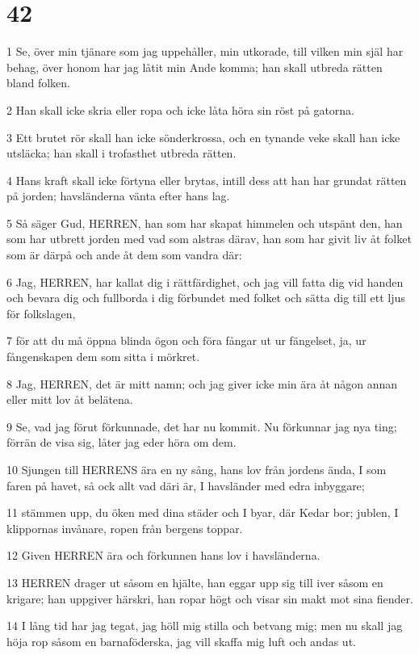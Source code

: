 \chapter{42}

\par 1 Se, över min tjänare som jag uppehåller, min utkorade, till vilken min själ har behag, över honom har jag låtit min Ande komma; han skall utbreda rätten bland folken.
\par 2 Han skall icke skria eller ropa och icke låta höra sin röst på gatorna.
\par 3 Ett brutet rör skall han icke sönderkrossa, och en tynande veke skall han icke utsläcka; han skall i trofasthet utbreda rätten.
\par 4 Hans kraft skall icke förtyna eller brytas, intill dess att han har grundat rätten på jorden; havsländerna vänta efter hans lag.
\par 5 Så säger Gud, HERREN, han som har skapat himmelen och utspänt den, han som har utbrett jorden med vad som alstras därav, han som har givit liv åt folket som är därpå och ande åt dem som vandra där:
\par 6 Jag, HERREN, har kallat dig i rättfärdighet, och jag vill fatta dig vid handen och bevara dig och fullborda i dig förbundet med folket och sätta dig till ett ljus för folkslagen,
\par 7 för att du må öppna blinda ögon och föra fångar ut ur fängelset, ja, ur fångenskapen dem som sitta i mörkret.
\par 8 Jag, HERREN, det är mitt namn; och jag giver icke min ära åt någon annan eller mitt lov åt belätena.
\par 9 Se, vad jag förut förkunnade, det har nu kommit. Nu förkunnar jag nya ting; förrän de visa sig, låter jag eder höra om dem.
\par 10 Sjungen till HERRENS ära en ny sång, hans lov från jordens ända, I som faren på havet, så ock allt vad däri är, I havsländer med edra inbyggare;
\par 11 stämmen upp, du öken med dina städer och I byar, där Kedar bor; jublen, I klippornas invånare, ropen från bergens toppar.
\par 12 Given HERREN ära och förkunnen hans lov i havsländerna.
\par 13 HERREN drager ut såsom en hjälte, han eggar upp sig till iver såsom en krigare; han uppgiver härskri, han ropar högt och visar sin makt mot sina fiender.
\par 14 I lång tid har jag tegat, jag höll mig stilla och betvang mig; men nu skall jag höja rop såsom en barnaföderska, jag vill skaffa mig luft och andas ut.
